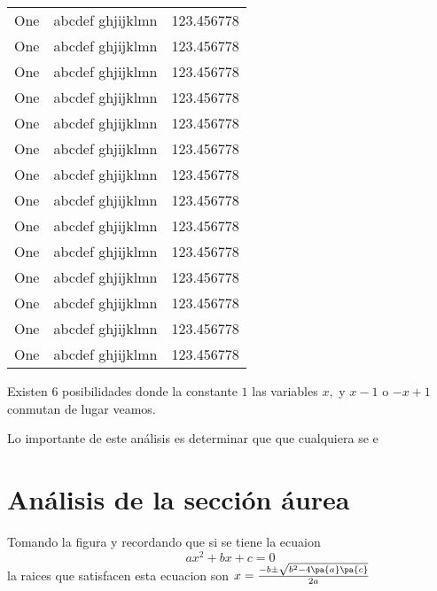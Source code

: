\begin{longtable}{|l|l|l|}
	One & abcdef ghjijklmn & 123.456778 \\
	One & abcdef ghjijklmn & 123.456778 \\
	One & abcdef ghjijklmn & 123.456778 \\
	One & abcdef ghjijklmn & 123.456778 \\
	One & abcdef ghjijklmn & 123.456778 \\
	One & abcdef ghjijklmn & 123.456778 \\
	One & abcdef ghjijklmn & 123.456778 \\
	One & abcdef ghjijklmn & 123.456778 \\
	One & abcdef ghjijklmn & 123.456778 \\
	One & abcdef ghjijklmn & 123.456778 \\
	One & abcdef ghjijklmn & 123.456778 \\
	One & abcdef ghjijklmn & 123.456778 \\
	One & abcdef ghjijklmn & 123.456778 \\
	One & abcdef ghjijklmn & 123.456778 \\
\end{longtable}





Existen 6 posibilidades donde la constante $1$ las variables $x,$ y $x-1$ o $-x+1$ conmutan de lugar veamos.

Lo importante de este análisis es determinar que que cualquiera se e



\section{Análisis de la sección áurea}
Tomando la figura y recordando que si se tiene la ecuaion $$ax^2+bx+c=0$$ la raices que satisfacen esta ecuacion son $x=\frac{-b\pm\sqrt{b^2-4\pa{a}\pa{c}}}{2a}$



